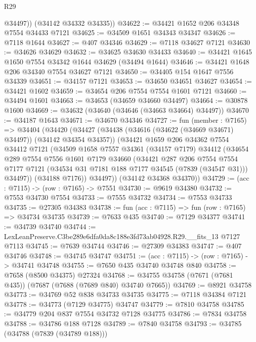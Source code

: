 \begin{lexlean}{R29}
\begin{coremodule}
          @34497))
      (@34142 @34332 @34335))
@34622 := @34421 @1652 @206 @34348 @7554 @34433 @7121
@34625 := @34509 @1651 @34343 @34347
@34626 := @7118 @1644
@34627 := @407 @34346
@34629 := @7118 @34627 @7121
@34630 := @34626 @34629
@34632 := @34625 @34630 @34433
@34640 := @34421 @1645 @1650 @7554 @34342 @1644 @34629 (@34494 @1644)
@34646 := @34421 @1648 @206 @34340 @7554 @34627 @7121
@34650 := @34405 @154 @1647 @7556 @34339
@34651 := @34157 @7121
@34653 := @34650 @34651 @34627
@34654 := @34421 @1602
@34659 := @34654 @206 @7554 @7554 @1601 @7121
@34660 := @34494 @1601
@34663 := @34653 (@34659 @34660 @34497)
@34664 := @30878 @1600
@34669 := @34632 (@34640 (@34646 (@34663 @34664) @34497))
@34670 := @34187 @1643
@34671 := @34670 @34346
@34727 := fun (member : @7165) =>
  @34404
    (@34420
      (@34427
        (@34438 (@34616 (@34622 (@34669 @34671) @34497)) (@34142 @34354 @34357))
        (@34421
          @1659
          @206
          @34362
          @7554
          @34412
          @7121
          (@34509
            @1658
            @7557
            @34361
            (@34157 @7179)
            @34412
            (@34654
              @289
              @7554
              @7556
              @1601
              @7179
              @34660
              (@34421
                @287
                @206
                @7554
                @7554
                @7177
                @7121
                (@34534 @31 @7181 @188 @7177 @34545 (@7839 (@34547 @31)))
                @34497))
            (@34188 @7176))
          @34497))
      (@34142 @34368 @34370))
@34729 := (acc : @7115) -> (row : @7165) -> @7551
@34730 := @9619 @34380
@34732 := @7553 @34730 @7554
@34733 := @7555 @34732
@34734 := @7553 @34733
@34735 := @27305 @34383
@34738 := fun (acc : @7115) => fun (row : @7165) => @34734 @34735
@34739 := @7633 @435
@34740 := @7129 @34377
@34741 := @34739 @34740
@34744 := LexLeanPreserve.C3be289e6dfa0da8c188e3fd73ab04928.R29.__fits_13 @7127 @7113
@34745 := @7639 @34744
@34746 := @27309 @34383
@34747 := @407 @34746
@34748 := @34745 @34747
@34751 := (acc : @7115) -> (row : @7165) -> @34741 @34748
@34755 := @7650 @435 @34740 @34748 @840
@34758 := @7658 (@8500 @34375) @27324
@34768 := @34755 @34758 (@7671 (@7681 @435)) (@7687 (@7688 (@7689 @840) @34740 @7665))
@34769 := @8921 @34758
@34773 := @34769 @52 @838 @34733 @34735
@34775 := @7118 @34384 @7121
@34778 := @34773 (@7129 @34775) @34747
@34779 := @7810 @34758
@34785 := @34779 @204 @837 @7554 @34732 @7128 @34775
@34786 := @7834 @34758
@34788 := @34786 @188 @7128
@34789 := @7840 @34758
@34793 := @34785 (@34788 (@7839 (@34789 @188)))

\end{coremodule}
\end{lexlean}
